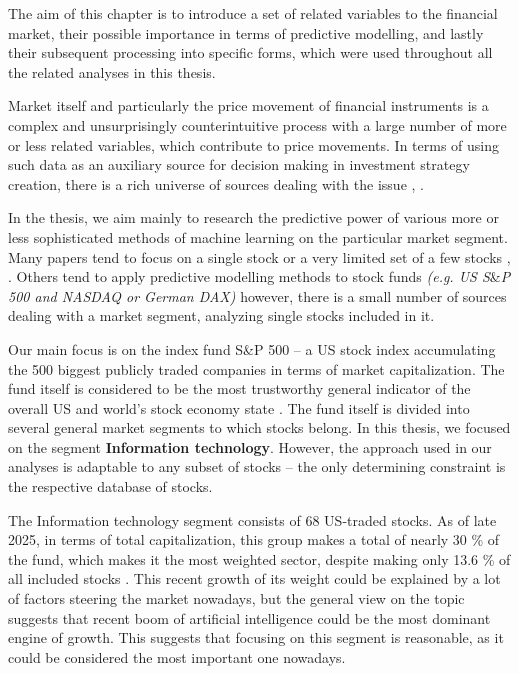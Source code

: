 The aim of this chapter is to introduce a set of related variables to the financial market, 
their possible importance in terms of predictive modelling, and lastly their subsequent processing 
into specific forms, which were used throughout all the related analyses in this thesis.
\par
Market itself and particularly the price movement of financial instruments is a complex and unsurprisingly
counterintuitive process with a large number of more or less related variables, which contribute to price movements. 
In terms of using such data as an auxiliary source for decision making in investment strategy creation, there is a rich
universe of sources dealing with the issue \cite{clanok1}, \cite{clanok2}.
\par
%
In the thesis, we aim mainly to research the predictive power of various more or less sophisticated
methods of machine learning on the particular market segment. Many papers tend to focus on a
single stock or a very limited set of a few stocks \cite{clanok5}, \cite{konferencia1}. Others tend to apply predictive modelling methods
to stock funds \textit{(e.g. US S}\&\textit{P 500 and NASDAQ or German DAX)} \cite{clanok4} however, there is 
a small number of sources dealing with a market segment, analyzing single stocks included in it.
\par
Our main focus is on the index fund S\&P 500 – a US stock index accumulating the 500 biggest publicly traded companies
in terms of market capitalization. The fund itself is considered to be the most trustworthy general indicator of the overall
US and world’s stock economy state \cite{snp500}. The fund itself is divided into several general market segments to which stocks belong. In this
thesis, we focused on the segment \textbf{Information technology}. However, the approach used in our analyses is adaptable to any subset of stocks –
the only determining constraint is the respective database of stocks.
\par
The Information technology segment consists of $68$ US-traded stocks. As of late 2025, in terms of total capitalization, this group makes a total of
nearly 30 \% of the fund, which makes it the most weighted sector, despite making only 13.6 \% of all included stocks \cite{cnbc}. This recent growth of its weight 
could be explained by a lot of factors steering the market nowadays, but the general view on the topic suggests that recent boom of artificial 
intelligence could be the most dominant engine of growth. This suggests that focusing on this segment is reasonable, as it could be considered the most important one nowadays.

